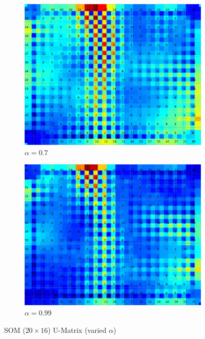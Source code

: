 \documentclass{acm_proc_article-sp}
\begin{document}
\begin{figure}
\begin{subfigure}[b]{0.24\linewidth}
    \end{subfigure}
    \begin{subfigure}[b]{0.24\linewidth}
        \includegraphics[width=\linewidth]{img/wine-20x16-u-matrix-alpha-0,7}
        \caption{$\alpha=0.7$}
        \label{fig:wine-20x16-u-matrix-alpha-0,7}
    \end{subfigure}
    \begin{subfigure}[b]{0.24\linewidth}
        \includegraphics[width=\linewidth]{img/wine-20x16-u-matrix-alpha-0,99}
        \caption{$\alpha=0.99$}
        \label{fig:wine-20x16-u-matrix-alpha-0,99}
    \end{subfigure}
    \caption{SOM ($20\times16$) U-Matrix (varied $\alpha$)}
    \label{fig:wine-20x16-u-matrix-alpha}
\end{figure}
\end{document}
